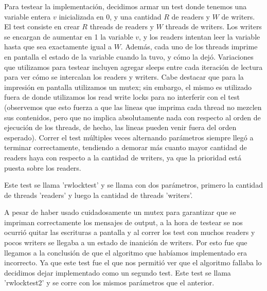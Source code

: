 \documentclass{article}
\begin{document}
Para testear la implementación, decidimos armar un test donde tenemos una variable entera $v$ inicializada en 0, y una cantidad $R$ de readers y $W$ de writers. El test consiste en crear $R$ threads de readers y $W$ threads de writers. Los writers se encargan de aumentar en 1 la variable $v$, y los readers intentan leer la variable hasta que sea exactamente igual a $W$. Además, cada uno de los threads imprime en pantalla el estado de la variable cuando la tuvo, y cómo la dejó. Variaciones que utilizamos para testear incluyen agregar sleeps entre cada iteración de lectura para ver cómo se intercalan los readers y writers. Cabe destacar que para la impresión en pantalla utilizamos un mutex; sin embargo, el mismo es utilizado fuera de donde utilizamos los read write locks para no interferir con el test (observemos que esto fuerza a que las lineas que imprima cada thread no mezclen sus contenidos, pero que no implica absolutamente nada con respecto al orden de ejecución de los threads, de hecho, las lineas pueden venir fuera del orden esperado). Correr el test múltiples veces alternando parámetros siempre llegó a terminar correctamente, tendiendo a demorar más cuanto mayor cantidad de readers haya con respecto a la cantidad de writers, ya que la prioridad está puesta sobre los readers.

Este test se llama 'rwlocktest' y se llama con dos parámetros, primero la cantidad de threads 'readers' y luego la cantidad de threads 'writers'.\par\smallbreak

A pesar de haber usado cuidadosamente un mutex para garantizar que se impriman correctamente los mensajes de output, a la hora de testear se nos ocurrió quitar las escrituras a pantalla y al correr los test con muchos readers y pocos writers se llegaba a un estado de inanición de writers. Por esto fue que llegamos a la conclusión de que el algoritmo que habíamos implementado era incorrecto. Ya que este test fue el que nos permitió ver que el algoritmo fallaba lo decidimos dejar implementado como un segundo test.
Este test se llama 'rwlocktest2' y se corre con los mismos parámetros que el anterior.
\end{document}
